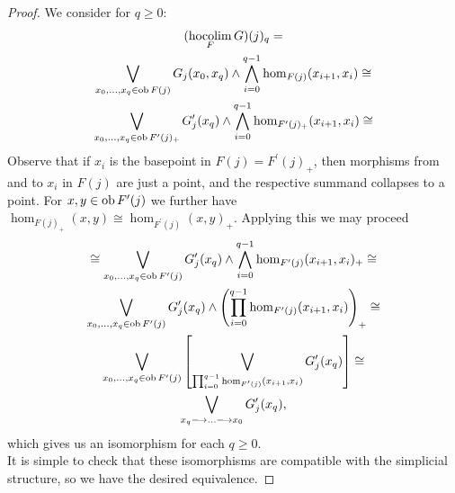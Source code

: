   \begin{proof}
    We consider for $q \geq 0$:
    \begin{gather*}
      (\hocolim_F G)(j)_q = \\%
      \bigvee_{x_0, \ldots, x_q \in \ob F(j)} %
        G_j(x_0,x_q) \wedge \bigwedge_{i=0}^{q-1} \hom_{F(j)}(x_{i+1},x_i) \cong \\%
      \bigvee_{x_0, \ldots, x_q \in \ob F^\prime(j)_+} %
        G^\prime_j(x_q) \wedge \bigwedge_{i=0}^{q-1} %
        \hom_{F^\prime(j)_+}(x_{i+1},x_i) \cong %
    \end{gather*}
    Observe that if $x_i$ is the basepoint in $F(j) = F^\prime(j)_+$, then
    morphisms from and to $x_i$ in $F(j)$ are just a point, and the respective
    summand collapses to a point. For $x, y \in \operatorname{ob} F^\prime(j)$ we further
    have $\hom_{F(j)_+}(x,y) \cong \hom_{F^\prime(j)}(x,y)_+$. Applying this
    we may proceed
    \begin{gather*}
      \cong \bigvee_{x_0, \ldots, x_q \in \ob F^\prime(j)} %
        G^\prime_j(x_q) \wedge \bigwedge_{i=0}^{q-1}
        \hom_{F^\prime(j)}(x_{i+1},x_i)_+ \cong \\%
      \bigvee_{x_0, \ldots, x_q \in \ob F^\prime(j)} %
        G^\prime_j(x_q) \wedge %
        \left (\prod_{i=0}^{q-1} \hom_{F^\prime(j)}(x_{i+1},x_i) \right)_+
        \cong \\%
      \bigvee_{x_0, \ldots, x_q \in \ob F^\prime(j)} \left[%
        \bigvee_{\prod_{i=0}^{q-1} \hom_{F^\prime(j)}(x_{i+1},x_i)} %
        G^\prime_j(x_q) \right] \cong \\%
        \bigvee_{x_q \to \ldots \to x_0} G^\prime_j(x_q),
    \end{gather*}
    which gives us an isomorphism for each $q \geq 0$.\\
    It is simple to check that these isomorphisms are compatible with the
    simplicial structure, so we have the desired equivalence.
  \end{proof}
